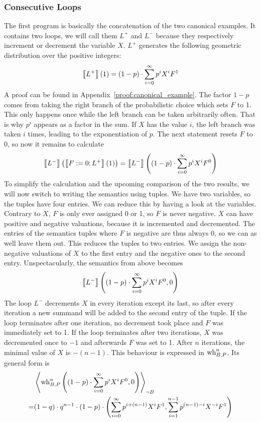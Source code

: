 \subsubsection*{Consecutive Loops}
The first program is basically the concatenation of the two canonical examples.
It contains two loops, we will call them $L^+$ and $L^-$ because they respectively increment or decrement the variable $X$.
$L^+$ generates the following geometric distribution over the positive integers:
\[ \left\llbracket L^+ \right\rrbracket\left(1\right) = (1-p) \cdot \sum_{i = 0}^{\infty} p^i X^i F^1 \]
A proof can be found in Appendix~\ref{proof:canonical_example}.
The factor $1-p$ comes from taking the right branch of the probabilistic choice which sets $F$ to 1.
This only happens once while the left branch can be taken arbitrarily often.
That is why $p^i$ appears as a factor in the sum.
If $X$ has the value $i$, the left branch was taken $i$ times, leading to the exponentiation of $p$.
The next statement resets $F$ to 0, so now it remains to calculate
\[ \left\llbracket L^- \right\rrbracket\left( \left\llbracket F := 0; L^+ \right\rrbracket(1) \right)
	= \left\llbracket L^- \right\rrbracket\left((1-p) \cdot \sum_{i = 0}^{\infty} p^i X^i F^0 \right) \]
To simplify the calculation and the upcoming comparison of the two results, we will now switch to writing the semantics using tuples.
We have two variables, so the tuples have four entries.
We can reduce this by having a look at the variables.
Contrary to $X$, $F$ is only ever assigned 0 or 1, so $F$ is never negative.
$X$ can have positive and negative valuations, because it is incremented and decremented.
The entries of the semantics tuples where $F$ is negative are thus always 0, so we can as well leave them out.
This reduces the tuples to two entries.
We assign the non-negative valuations of $X$ to the first entry and the negative ones to the second entry.
Unspectacularly, the semantics from above becomes
\[ \left\llbracket L^- \right\rrbracket \left(  (1-p) \cdot \sum_{i = 0}^{\infty} p^i X^i F^0 , 0 \right) \]
The loop $L^-$ decrements $X$ in every iteration except its last, so after every iteration a new summand will be added to the second entry of the tuple.
If the loop terminates after one iteration, no decrement took place and $F$ was immediately set to 1.
If the loop terminates after two iterations, $X$ was decremented once to $-1$ and afterwards $F$ was set to 1.
After $n$ iterations, the minimal value of $X$ is $-(n-1)$.
This behaviour is expressed in $\operatorname{wh}_{B, P}^n$.
Its general form is
\begin{align*}
	 & \left\langle  \operatorname{wh}_{B, P}^n\left(  (1-p) \cdot \sum_{i = 0}^{\infty} p^i X^i F^0 , 0 \right)  \right\rangle_{\lnot B} \\
	=& (1-q) \cdot q^{n-1} \cdot (1-p) \cdot \left( 
		\sum_{i=0}^{\infty} p^{i+(n-1)} X^i F^1,
		\sum_{i=1}^{n-1} p^{(n-1)-i} X^{-i} F^1 \right)
\end{align*}
